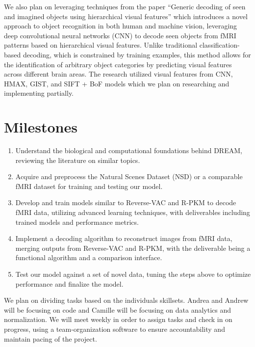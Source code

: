 \documentclass[10pt,twocolumn,letterpaper]{article}
\begin{document}
We also plan on leveraging techniques from the paper “Generic decoding of seen and imagined objects using hierarchical visual features” \cite{horikawa2017generic} which introduces a novel approach to object recognition in both human and machine vision, leveraging deep convolutional neural networks (CNN) to decode seen objects from fMRI patterns based on hierarchical visual features. Unlike traditional classification-based decoding, which is constrained by training examples, this method allows for the identification of arbitrary object categories by predicting visual features across different brain areas. The research utilized visual features from CNN, HMAX, GIST, and SIFT + BoF models which we plan on researching and implementing partially.

\section{Milestones}

\begin{enumerate}
    \item Understand the biological and computational foundations behind DREAM, reviewing the literature on similar topics. 
    \item Acquire and preprocess the Natural Scenes Dataset (NSD) or a comparable fMRI dataset for training and testing our model.
    \item Develop and train models similar to Reverse-VAC and R-PKM to decode fMRI data, utilizing advanced learning techniques, with deliverables including trained models and performance metrics.
    \item Implement a decoding algorithm to reconstruct images from fMRI data, merging outputs from Reverse-VAC and R-PKM, with the deliverable being a functional algorithm and a comparison interface.
    \item Test our model against a set of novel data, tuning the steps above to optimize performance and finalize the model.
\end{enumerate}

We plan on dividing tasks based on the individuals skillsets. Andrea and Andrew will be focusing on code and Camille will be focusing on data analytics and normalization. We will meet weekly in order to assign tasks and check in on progress, using a team-organization software to ensure accountability and maintain pacing of the project.

{\small


}
\end{document}
